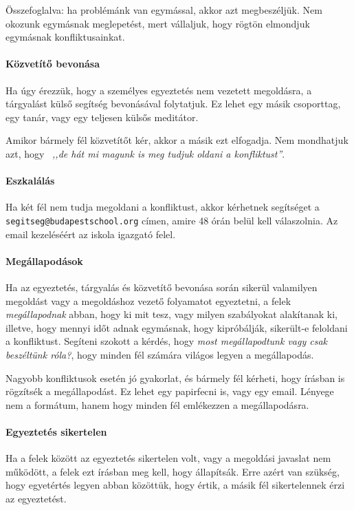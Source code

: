 Összefoglalva: ha problémánk van egymással, akkor azt megbeszéljük. Nem
okozunk egymásnak meglepetést, mert vállaljuk, hogy rögtön elmondjuk
egymásnak konfliktusainkat.

\paragraph{Közvetítő bevonása}

Ha úgy érezzük, hogy a személyes egyeztetés nem vezetett megoldásra, a
tárgyalást külső segítség bevonásával folytatjuk. Ez lehet egy másik
csoporttag, egy tanár, vagy egy teljesen külsős meditátor.

Amikor bármely fél közvetítőt kér, akkor a másik ezt elfogadja. Nem mondhatjuk
azt, hogy  \emph{,,de hát mi magunk is meg tudjuk oldani a konfliktust''}.

\paragraph{Eszkalálás}

Ha két fél nem tudja megoldani a konfliktust, akkor kérhetnek segítséget a
\texttt{segitseg@budapestschool.org}
címen, amire 48 órán belül kell válaszolnia. Az email kezeléséért az iskola
igazgató felel.

\paragraph{Megállapodások}

Ha az egyeztetés, tárgyalás és közvetítő bevonása során sikerül
valamilyen megoldást vagy a megoldáshoz vezető folyamatot egyeztetni, a
felek \emph{megállapodnak} abban, hogy ki mit tesz, vagy milyen szabályokat
alakítanak
ki, illetve, hogy mennyi időt adnak egymásnak, hogy kipróbálják, sikerült-e
feloldani a konfliktust.
Segíteni szokott a kérdés, hogy \emph{most megállapodtunk vagy csak beszéltünk
      róla?}, hogy minden fél számára világos legyen a megállapodás.

Nagyobb konfliktusok esetén jó gyakorlat, és bármely fél kérheti, hogy
írásban is rögzítsék a megállapodást. Ez lehet egy papirfecni is, vagy egy
email. Lényege nem a formátum, hanem  hogy minden fél emlékezzen a
megállapodásra.

\paragraph{Egyeztetés sikertelen}

Ha a felek között az egyeztetés sikertelen volt, vagy a megoldási
javaslat nem működött, a felek ezt írásban meg kell, hogy állapítsák. Erre
azért van szükség, hogy egyetértés legyen abban közöttük, hogy értik, a
másik fél sikertelennek érzi az egyeztetést.

